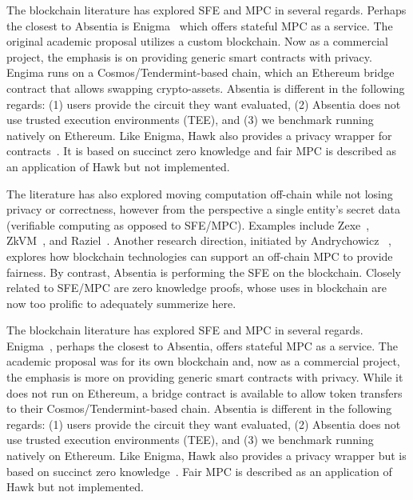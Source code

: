 The blockchain literature has explored SFE and MPC in several regards. Perhaps the closest to Absentia is Enigma~\cite{zyskind2015enigma} which offers stateful MPC as a service. The original academic proposal utilizes a custom blockchain. Now as a commercial project, the emphasis is on providing generic smart contracts with privacy. Engima runs on a Cosmos/Tendermint-based chain, which an Ethereum bridge contract that allows swapping crypto-assets. Absentia is different in the following regards: (1) users provide the circuit they want evaluated, (2) Absentia does not use trusted execution environments (TEE), and (3) we benchmark running natively on Ethereum. Like Enigma, Hawk also provides a privacy wrapper for contracts~\cite{kosba2016hawk}. It is based on succinct zero knowledge and fair MPC is described as an application of Hawk but not implemented.  



The literature has also explored moving computation off-chain while not losing privacy or correctness, however from the perspective a single entity's secret data (\ie verifiable computing as opposed to SFE/MPC). Examples include Zexe~\cite{bowe2020zexe}, ZkVM~\cite{zkvm}, and Raziel~\cite{sanchez2018raziel}. Another research direction, initiated by Andrychowicz \etal~\cite{andrychowicz2014secure}, explores how blockchain technologies can support an off-chain MPC to provide fairness. By contrast, Absentia is performing the SFE on the blockchain. Closely related to SFE/MPC are zero knowledge proofs, whose uses in blockchain are now too prolific to adequately summerize here.

The blockchain literature has explored SFE and MPC in several regards. Enigma~\cite{zyskind2015enigma}, perhaps the closest to Absentia, offers stateful MPC as a service. The academic proposal was for its own blockchain and, now as a commercial project, the emphasis is more on providing generic smart contracts with privacy. While it does not run on Ethereum, a bridge contract is available to allow token transfers to their Cosmos/Tendermint-based chain. Absentia is different in the following regards: (1) users provide the circuit they want evaluated, (2) Absentia does not use trusted execution environments (TEE), and (3) we benchmark running natively on Ethereum. Like Enigma, Hawk also provides a privacy wrapper but is based on succinct zero knowledge~\cite{kosba2016hawk}. Fair MPC is described as an application of Hawk but not implemented.  



